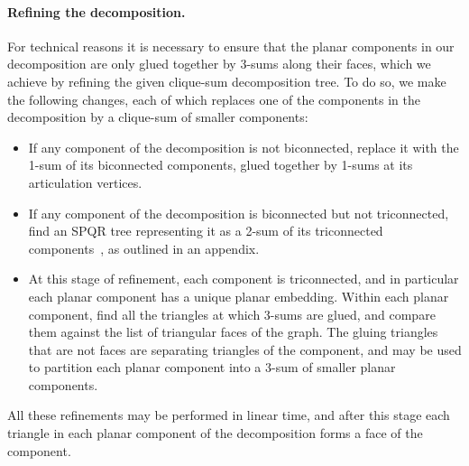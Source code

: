 \documentclass[runningheads]{llncs}
\begin{document}
\paragraph{\bf Refining the decomposition.}
For technical reasons it is necessary to ensure that the planar components in our decomposition are only glued together by 3-sums along their faces, which we achieve by refining the given clique-sum decomposition tree. To do so, we make the following changes, each of which replaces one of the components in the decomposition by a clique-sum of smaller components:
\begin{itemize}
\item If any component of the decomposition is not biconnected, replace it with the 1-sum of its biconnected components, glued together by 1-sums at its articulation vertices.
\item If any component of the decomposition is biconnected but not triconnected, find an SPQR tree representing it as a 2-sum of its triconnected components~\cite{dt-ipt-89,ht-dgtc-73,m-scpcg-37}, as outlined in an appendix.
\item At this stage of refinement, each component is triconnected, and in particular each planar component has a unique planar embedding. Within each planar component, find all the triangles at which 3-sums are glued, and compare them against the list of triangular faces of the graph. The gluing triangles that are not faces are separating triangles of the component, and may be used to partition each planar component into a 3-sum of smaller planar components.
\end{itemize} 
All these refinements may be performed in linear time, and after this stage each triangle in each planar component of the decomposition forms a face of the component.
\end{document}
